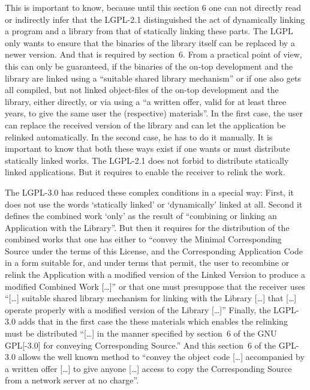 \begin{itemize}
  This is important to know, because until this section 6 one can not directly
  read or indirectly infer that the LGPL-2.1 distinguished the act of
  dynamically linking a program and a library from that of statically linking
  these parts. The LGPL only wants to ensure that the binaries of the library
  itself can be replaced by a newer version. And that is required by
  section~6. 
  From a practical point of view, this can only be guaranteed, if the binaries of
  the on-top development and the library are linked using a \enquote{suitable
  shared library mechanism} or if one also gets all compiled,
  but not linked object-files of the on-top development and the library, either
  directly, or via using a \enquote{a written offer, valid for at least three
  years, to give the same user the (respective) materials}.  In
  the first case, the user can replace the received version of the library and
  can let the application be relinked  automatically. In the second case, he has
  to do it manually. It is important to know that both these ways exist if one
  wants or must distribute statically linked works. The LGPL-2.1 does not forbid
  to distribute statically linked applications. But it requires to enable the
  receiver to relink the work. 
  
  The LGPL-3.0 has reduced these complex conditions in a special way: First, it
  does not use the words `statically linked' or `dynamically' linked at
  all. Second it defines the combined work `only' as the result of
  \enquote{combining or linking an Application with the
  Library}.  But then it requires for the distribution of the
  combined works that one has either to \enquote{convey the Minimal
  Corresponding Source under the terms of this License, and the Corresponding
  Application Code in a form suitable for, and under terms that permit, the user
  to recombine or relink the Application with a modified version of the Linked
  Version to produce a modified Combined Work [\ldots]} or that one must
  presuppose that the receiver uses \enquote{[\ldots] suitable shared library
  mechanism for linking with the Library [\ldots] that [\ldots] operate properly
  with a modified version of the Library [\ldots]} Finally,
  the LGPL-3.0 adds that in the first case the these materials which enables the
  relinking must be distributed \enquote{[\ldots] in the manner specified by
  section~6 of the GNU GPL[-3.0] for conveying Corresponding
  Source.}  And this section~6 of the GPL-3.0 allows the well
  known method to \enquote{convey the object code [\ldots] accompanied by a
  written offer [\ldots] to give anyone [\ldots] access to copy the
  Corresponding Source from a network server at no charge}.


\end{itemize}
